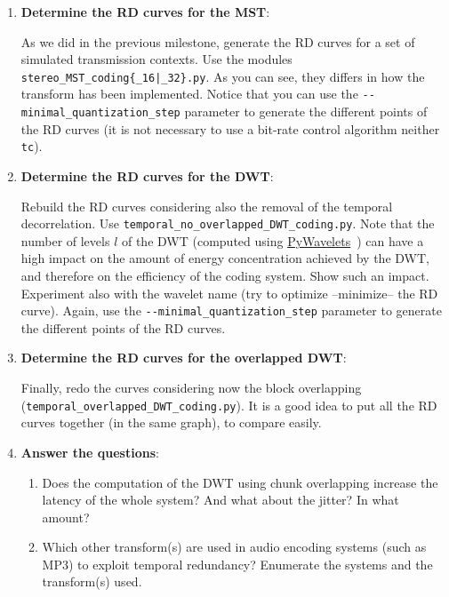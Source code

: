 \begin{enumerate}

\item \textbf{Determine the RD curves for the MST}:
  
As we did in the previous milestone, generate the RD curves for a set
of simulated transmission contexts. Use the modules
\texttt{stereo\_MST\_coding\{\_16|\_32\}.py}. As you can see, they
differs in how the transform has been implemented.  Notice that you
can use the \verb|--minimal_quantization_step| parameter to generate
the different points of the RD curves (it is not necessary to use a
bit-rate control algorithm neither \texttt{tc}).

\item \textbf{Determine the RD curves for the DWT}:

  Rebuild the RD curves considering also the removal of the temporal
  decorrelation. Use \verb|temporal_no_overlapped_DWT_coding.py|. Note
  that the number of levels $l$ of the DWT (computed using
  \href{https://pywavelets.readthedocs.io/en/latest/}{PyWavelets}~\cite{lee2019pywavelets})
  can have a high impact on the amount of energy concentration
  achieved by the DWT, and therefore on the efficiency of the coding
  system. Show such an impact. Experiment also with the wavelet name
  (try to optimize --minimize-- the RD curve). Again, use the
  \verb|--minimal_quantization_step| parameter to generate the
  different points of the RD curves.


\item \textbf{Determine the RD curves for the overlapped DWT}:

Finally, redo the curves considering now the block overlapping
(\verb|temporal_overlapped_DWT_coding.py|). It is a good idea to put
all the RD curves together (in the same graph), to compare easily.


\item \textbf{Answer the questions}:

\begin{enumerate}
  

\item Does the computation of the DWT using chunk overlapping increase
  the latency of the whole system? And what about the jitter? In what amount?

\item Which other transform(s) are used in audio encoding systems
  (such as MP3) to exploit temporal redundancy? Enumerate the
  systems and the transform(s) used.

\end{enumerate}

\end{enumerate}

